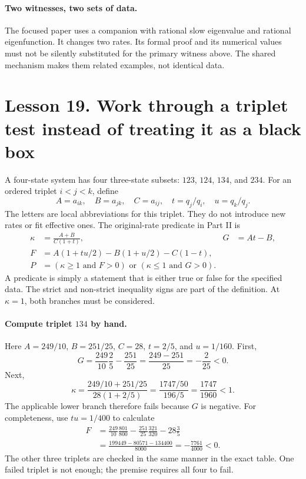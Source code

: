 \documentclass[11pt]{article}
\begin{document}
\paragraph{Two witnesses, two sets of data.}
The focused paper uses a companion with rational slow eigenvalue and
rational eigenfunction. It changes two rates. Its formal proof and its
numerical values must not be silently substituted for the primary witness
above. The shared mechanism makes them related examples, not identical data.

\clearpage
\section*{Lesson 19. Work through a triplet test instead of treating it as a black box}
A four-state system has four three-state subsets: $123$, $124$, $134$, and
$234$. For an ordered triplet $i<j<k$, define
\[
A=a_{ik},\quad B=a_{jk},\quad C=a_{ij},\quad
 t=q_j/q_i,\quad u=q_k/q_j.
\]
The letters are local abbreviations for this triplet. They do not introduce
new rates or fit effective ones. The original-rate predicate in Part II is
\begin{align*}
\kappa&=\frac{A+B}{C(1+t)},&G&=At-B,\\
F&=A(1+tu/2)-B(1+u/2)-C(1-t),\\
P&=(\kappa\geq1\text{ and }F>0)
\text{ or }(\kappa\leq1\text{ and }G>0).
\end{align*}
A predicate is simply a statement that is either true or false for the
specified data. The strict and non-strict inequality signs are part of the
definition. At $\kappa=1$, both branches must be considered.

\paragraph{Compute triplet $134$ by hand.}
Here $A=249/10$, $B=251/25$, $C=28$, $t=2/5$, and $u=1/160$.
First,
\[
G=\frac{249}{10}\frac25-\frac{251}{25}
=\frac{249-251}{25}=-\frac2{25}<0.
\]
Next,
\[
\kappa=\frac{249/10+251/25}{28(1+2/5)}
=\frac{1747/50}{196/5}=\frac{1747}{1960}<1.
\]
The applicable lower branch therefore fails because $G$ is negative.
For completeness, use $tu=1/400$ to calculate
\begin{align*}
F&=\frac{249}{10}\frac{801}{800}
-\frac{251}{25}\frac{321}{320}-28\frac35\\
&=\frac{199449-80571-134400}{8000}
=-\frac{7761}{4000}<0.
\end{align*}
The other three triplets are checked in the same manner in the exact table.
One failed triplet is not enough; the premise requires all four to fail.
\end{document}
